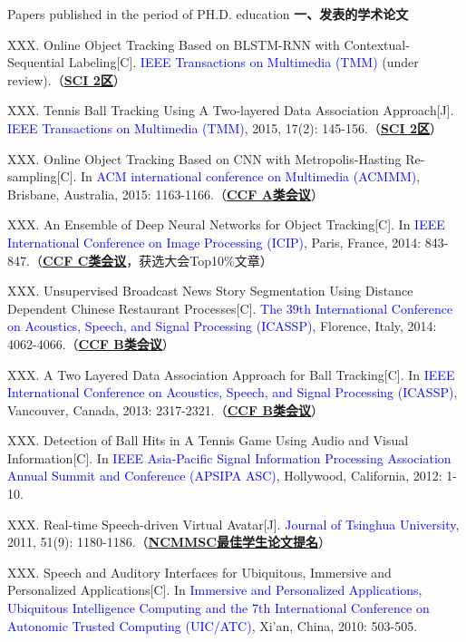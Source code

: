 
{} {Papers published in the period of PH.D. education}
\setlength{\parindent}{0em}
\textbf{一、发表的学术论文}
\begin{publist}
\item XXX. Online Object Tracking Based on BLSTM-RNN with Contextual-Sequential Labeling[C]. \textcolor{blue}{IEEE Transactions on Multimedia (TMM)} (under review).（\underline{\bf SCI 2区}）
\item XXX. Tennis Ball Tracking Using A Two-layered Data Association Approach[J]. \textcolor{blue}{IEEE Transactions on Multimedia (TMM)}, 2015, 17(2): 145-156.（\underline{\bf SCI 2区}）
\item XXX. Online Object Tracking Based on CNN with Metropolis-Hasting Re-sampling[C]. In \textcolor{blue}{ACM international conference on Multimedia (ACMMM)}, Brisbane, Australia, 2015: 1163-1166.（\underline{\bf CCF A类会议}）
\item XXX. An Ensemble of Deep Neural Networks for Object Tracking[C]. In \textcolor{blue}{IEEE International Conference on Image Processing (ICIP)}, Paris, France, 2014: 843-847.（\underline{\bf CCF C类会议}，获选大会Top10\%文章）
\item XXX. Unsupervised Broadcast News Story Segmentation Using Distance Dependent Chinese Restaurant Processes[C]. \textcolor{blue}{The 39th International Conference on Acoustics, Speech, and Signal Processing (ICASSP)}, Florence, Italy, 2014: 4062-4066.（\underline{\bf CCF B类会议}）
\item XXX. A Two Layered Data Association Approach for Ball Tracking[C]. In \textcolor{blue}{IEEE International Conference on Acoustics, Speech, and Signal Processing (ICASSP)}, Vancouver, Canada, 2013: 2317-2321.（\underline{\bf CCF B类会议}）
\item XXX. Detection of Ball Hits in A Tennis Game Using Audio and Visual Information[C]. In \textcolor{blue}{IEEE Asia-Pacific Signal Information Processing Association Annual Summit and Conference (APSIPA ASC)}, Hollywood, California, 2012: 1-10.
\item XXX. Real-time Speech-driven Virtual Avatar[J]. \textcolor{blue}{Journal of Tsinghua University}, 2011, 51(9): 1180-1186.（\underline{\bf NCMMSC最佳学生论文提名}）
\item XXX. Speech and Auditory Interfaces for Ubiquitous, Immersive and Personalized Applications[C]. In \textcolor{blue}{Immersive and Personalized Applications, Ubiquitous Intelligence Computing and the 7th International Conference on Autonomic Trusted Computing (UIC/ATC)}, Xi’an, China, 2010: 503-505.
\end{publist}
\vspace{0.5cm}

